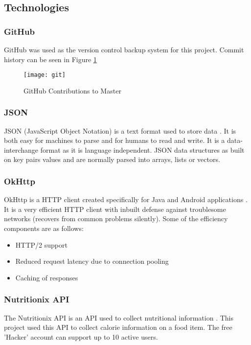 \tocless\subsection{Technologies}

\tocless\subsubsection{GitHub}
GitHub was used as the version control backup system for this project.
Commit history can be seen in Figure \ref{fig:git}

\begin{figure}[h]
    \texttt{[image: git]}
    \caption{GitHub Contributions to Master}
    \label{fig:git}
\end{figure}

\tocless\subsubsection{JSON}
JSON (JavaScript Object Notation) is a text format used to store data \parencite{json}.
It is both easy for machines to parse and for humans to read and write.
It is a data-interchange format as it is language independent.
JSON data structures as built on key pairs values and are normally parsed into arrays, lists or vectors.

\tocless\subsubsection{OkHttp}
OkHttp is a HTTP client created specifically for Java and Android applications \parencite{okhttp}.
It is a very efficient HTTP client with inbuilt defense against troublesome networks (recovers from common problems silently).
Some of the efficiency components are as follows:
\begin{itemize}
    \item{HTTP/2 support}
    \item{Reduced request latency due to connection pooling}
    \item{Caching of responses}
\end{itemize}

\tocless\subsubsection{Nutritionix API}
The Nutritionix API is an API used to collect nutritional information \parencite{nutritionix}.
This project used this API to collect calorie information on a food item.
The free 'Hacker' account can support up to 10 active users.

